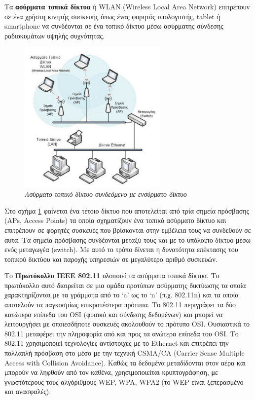 Τα \textbf{ασύρματα τοπικά δίκτυα} ή WLAN (Wireless Local Area Network) επιτρέπουν σε ένα χρήστη κινητής συσκευής όπως ένας φορητός υπολογιστής, tablet ή smartphone να συνδέονται σε ένα τοπικό δίκτυο μέσω ασύρματης σύνδεσης ραδιοκυμάτων υψηλής συχνότητας.

\begin{figure}[!ht]
  \centering
  \includegraphics[width=0.65\textwidth]{images/chapter2/2-7}
  \caption {\textsl{Ασύρματο τοπικό δίκτυο συνδεόμενο με ενσύρματο δίκτυο}}
  \label{2-7}
\end{figure}

Στο σχήμα \ref{2-7} φαίνεται ένα τέτοιο δίκτυο που αποτελείται από τρία σημεία πρόσβασης (APs, Access Points) τα οποία σχηματίζουν ένα τοπικό ασύρματο δίκτυο και επιτρέπουν σε φορητές συσκευές που βρίσκονται στην εμβέλεια τους να συνδεθούν σε αυτά. Τα σημεία πρόσβασης συνδέονται μεταξύ τους και με το υπόλοιπο δίκτυο μέσω ενός μεταγωγέα (switch). Με αυτό το τρόπο δίνεται η δυνατότητα επέκτασης του τοπικού δικτύου και παροχής υπηρεσιών σε μεγαλύτερο αριθμό συσκευών. 

Το \textbf{Πρωτόκολλο IEEE 802.11} υλοποιεί τα ασύρματα τοπικά δίκτυα. Το πρωτόκολλο αυτό διαιρείται σε μια ομάδα προτύπων ασύρματης δικτύωσης  τα οποία χαρακτηρίζονται με τα γράμματα από το `a' ως το `n' (π.χ. 802.11n) και τα οποία αποτελούν τα παγκοσμίως επικρατέστερα πρότυπα. Το 802.11 περιγράφει τα δύο κατώτερα επίπεδα του OSI (φυσικό και σύνδεσης δεδομένων) και μπορεί να λειτουργήσει με οποιεσδήποτε συσκευές ακολουθούν το πρότυπο OSI. Ουσιαστικά το 802.11 μεταφέρει την πληροφορία από και προς τα ανώτερα επίπεδα του OSI. Το 802.11 χρησιμοποιεί τεχνολογίες αντίστοιχες με το Ethernet και επιτρέπει την πολλαπλή πρόσβαση στο μέσο με την τεχνική CSMA/CA  (Carrier Sense Multiple Access with Collision Avoidance). Καθώς τα δεδομένα μεταδίδονται στον αέρα και μπορούν να ληφθούν από τον καθένα, χρησιμοποιείται κρυπτογράφηση, με  γνωστότερους τους αλγόριθμους WEP, WPA, WPA2 (το WEP είναι ξεπερασμένο και ανασφαλές).

